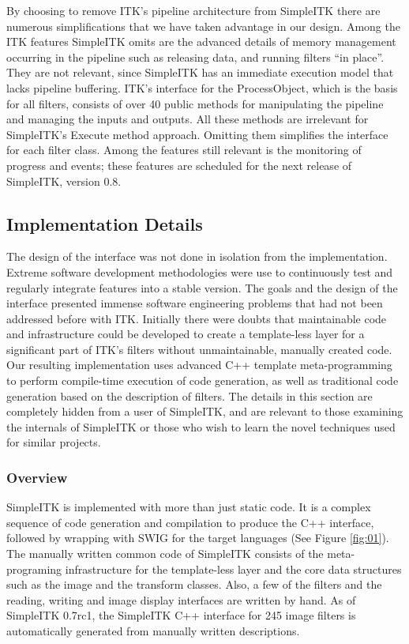 \documentclass{frontiersMED} %
\begin{document}
By choosing to remove ITK’s pipeline architecture from SimpleITK there
are numerous simplifications that we have taken advantage in our
design. Among the ITK features SimpleITK omits are the advanced
details of memory management occurring in the pipeline such as
releasing data, and running filters “in place”. They are not relevant,
since SimpleITK has an immediate execution model that lacks pipeline
buffering. ITK’s interface for the ProcessObject, which is the basis
for all filters, consists of over 40 public methods for manipulating
the pipeline and managing the inputs and outputs. All these methods
are irrelevant for SimpleITK’s Execute method approach. Omitting them
simplifies the interface for each filter class.  Among the features
still relevant is the monitoring of progress and events; these
features are scheduled for the next release of SimpleITK, version 0.8.

\subsection{Implementation Details}
The design of the interface was not done in isolation from the
implementation. Extreme software development methodologies were use to
continuously test and regularly integrate features into a stable
version.  The goals and the design of the interface presented immense
software engineering problems that had not been addressed before with
ITK. Initially there were doubts that maintainable code and
infrastructure could be developed to create a template-less layer for
a significant part of ITK’s filters without unmaintainable, manually
created code. Our resulting implementation uses advanced C++ template
meta-programming to perform compile-time execution of code generation,
as well as traditional code generation based on the description of
filters. The details in this section are completely hidden from a user
of SimpleITK, and are relevant to those examining the internals of
SimpleITK or those who wish to learn the novel techniques used for
similar projects.

\subsubsection{Overview}
SimpleITK is implemented with more than just static code. It is a
complex sequence of code generation and compilation to produce the C++
interface, followed by wrapping with SWIG for the target
languages (See Figure \ref{fig:01}). The manually written common code of SimpleITK consists of
the meta-programing infrastructure for the template-less layer and the
core data structures such as the image and the transform
classes. Also, a few of the filters and the reading, writing and image
display interfaces are written by hand. As of SimpleITK 0.7rc1, the
SimpleITK C++ interface for 245 image filters is automatically
generated from manually written descriptions.
\end{document}
